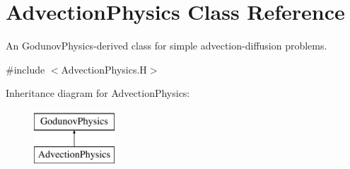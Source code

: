 \hypertarget{class_advection_physics}{}\section{Advection\+Physics Class Reference}
\label{class_advection_physics}


An Godunov\+Physics-\/derived class for simple advection-\/diffusion problems.  




{\ttfamily \#include $<$Advection\+Physics.\+H$>$}

Inheritance diagram for Advection\+Physics\+:\begin{figure}[H]
\begin{center}
\leavevmode
\includegraphics[height=2.000000cm]{class_advection_physics}
\end{center}
\end{figure}
